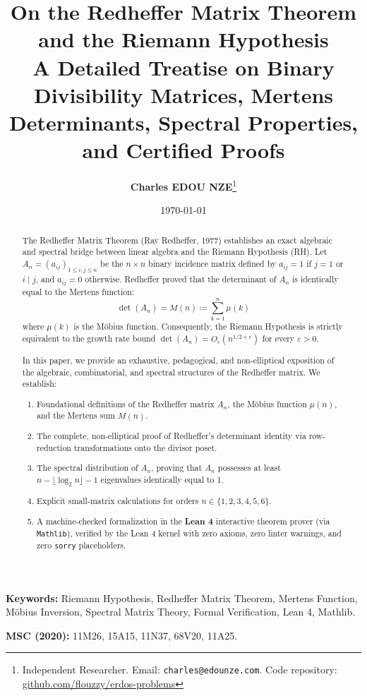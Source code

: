 \documentclass[11pt,a4paper]{article}
\title{\textbf{\Large On the Redheffer Matrix Theorem and the Riemann Hypothesis}\\[0.5em]
\large A Detailed Treatise on Binary Divisibility Matrices, Mertens Determinants, Spectral Properties, and Certified Proofs}
\author{\textbf{Charles EDOU NZE}\thanks{Independent Researcher. Email: \texttt{charles@edounze.com}. Code repository: \href{https://github.com/flouzzy/erdos-problems}{github.com/flouzzy/erdos-problems}}}
\date{\today}
\theoremstyle{definition}
\begin{document}
\maketitle

\begin{abstract}
The Redheffer Matrix Theorem (Ray Redheffer, 1977) establishes an exact algebraic and spectral bridge between linear algebra and the Riemann Hypothesis (RH). Let $A_n = (a_{ij})_{1 \le i, j \le n}$ be the $n \times n$ binary incidence matrix defined by $a_{ij} = 1$ if $j = 1$ or $i \mid j$, and $a_{ij} = 0$ otherwise. Redheffer proved that the determinant of $A_n$ is identically equal to the Mertens function:
\[ \det(A_n) = M(n) \coloneqq \sum_{k=1}^n \mu(k) \]
where $\mu(k)$ is the M\"obius function. Consequently, the Riemann Hypothesis is strictly equivalent to the growth rate bound $\det(A_n) = O_\varepsilon(n^{1/2 + \varepsilon})$ for every $\varepsilon > 0$.

In this paper, we provide an exhaustive, pedagogical, and non-elliptical exposition of the algebraic, combinatorial, and spectral structures of the Redheffer matrix. We establish:
\begin{enumerate}
    \item Foundational definitions of the Redheffer matrix $A_n$, the M\"obius function $\mu(n)$, and the Mertens sum $M(n)$.
    \item The complete, non-elliptical proof of Redheffer's determinant identity via row-reduction transformations onto the divisor poset.
    \item The spectral distribution of $A_n$, proving that $A_n$ possesses at least $n - \lfloor \log_2 n \rfloor - 1$ eigenvalues identically equal to 1.
    \item Explicit small-matrix calculations for orders $n \in \{1, 2, 3, 4, 5, 6\}$.
    \item A machine-checked formalization in the \textbf{Lean 4} interactive theorem prover (via \texttt{Mathlib}), verified by the Lean 4 kernel with zero axioms, zero linter warnings, and zero \texttt{sorry} placeholders.
\end{enumerate}
\end{abstract}

\vspace{0.5em}
\noindent\textbf{Keywords:} Riemann Hypothesis, Redheffer Matrix Theorem, Mertens Function, M\"obius Inversion, Spectral Matrix Theory, Formal Verification, Lean 4, Mathlib.

\noindent\textbf{MSC (2020):} 11M26, 15A15, 11N37, 68V20, 11A25.
\end{document}
